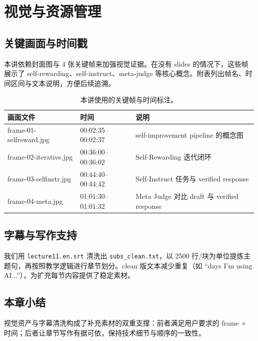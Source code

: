 \section{视觉与资源管理}
\subsection{关键画面与时间戳}
本讲依赖封面图与 4 张关键帧来加强视觉证据。在没有 slides 的情况下，这些帧展示了 self-rewarding、self-instruct、meta-judge 等核心概念。附表列出帧名、时间区间与文本说明，方便后续追溯。

\begin{table}[H]
\centering
\begin{tabular}{p{3cm}p{3cm}p{7cm}}
\toprule
画面文件 & 时间 & 说明 \\
\midrule
frame-01-selfreward.jpg & 00:02:35--00:02:37 & self-improvement pipeline 的概念图 \\
frame-02-iterative.jpg & 00:36:00--00:36:02 & Self-Rewarding 迭代闭环 \\
frame-03-selfinstr.jpg & 00:44:40--00:44:42 & Self-Instruct 任务与 verified response \\
frame-04-meta.jpg & 01:01:30--01:01:32 & Meta Judge 对比 draft 与 verified response \\
\bottomrule
\end{tabular}
\caption{本讲使用的关键帧与时间标注。}
\end{table}

\subsection{字幕与写作支持}
我们用 \texttt{lecture11.en.srt} 清洗出 \texttt{subs\_clean.txt}，以 2500 行/块为单位提炼主题句，再按照教学逻辑进行章节划分。clean 版文本减少重复（如 ``days I'm using AI...''），为扩充每节内容提供了稳定素材。

\subsection{本章小结}
视觉资产与字幕清洗构成了补充素材的双重支撑：前者满足用户要求的 frame + 时间；后者让章节写作有据可依，保持技术细节与顺序的一致性。

